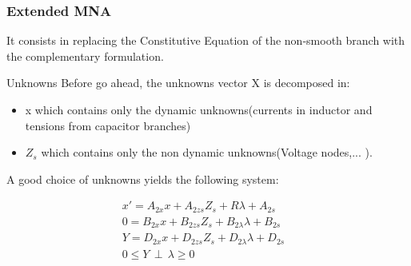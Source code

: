 
\frame
{
\frametitle{Extended MNA}
 It consists in replacing the Constitutive Equation of the non-smooth branch with the complementary
 formulation.

 \begin{block}{Unknowns}
 Before go ahead, the unknowns vector X is decomposed in:
\begin{itemize}
\item x which contains only the dynamic unknowns(currents in inductor and tensions from capacitor branches)
\item $Z_{s}$ which contains only the non dynamic unknowns(Voltage nodes,... ).
\end{itemize}
  \end{block}
  
 \begin{block}{A good choice of unknowns yields the following system:}
 
 \begin{eqnarray}
x'=A_{2x}x +A_{2zs}Z_{s} +R \lambda +A_{2s}&\label{eq2}\\
0=B_{2x}x+B_{2zs}Z_{s} + B_{2\lambda}\lambda + B_{2s}&\label{eq3}\\
Y=D_{2x}x+D_{2zs}Z_{s}+D_{2\lambda}\lambda + D_{2s} &\label{eq4}\\
0 \leq Y \, \perp \, \lambda \geq 0&\label{eqperp}
\end{eqnarray}

  \end{block}


}

